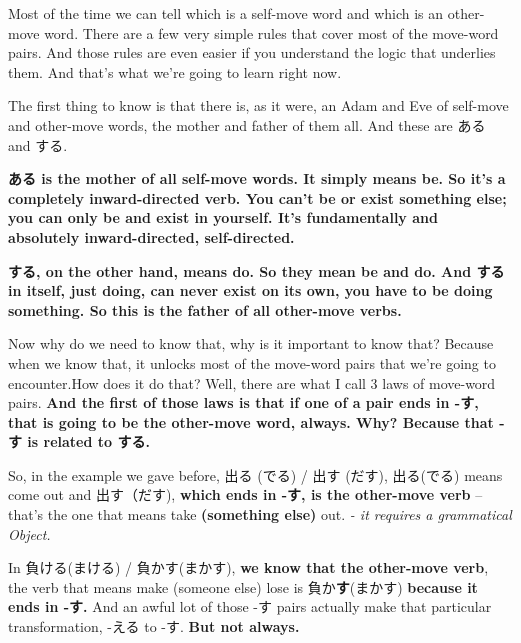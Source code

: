 Most of the time we can tell which is a self-move word and which is an other-move word. There are a few very simple rules that cover most of the move-word pairs. And those rules are even easier if you understand the logic that underlies them. And that's what we're going to learn right now.

\startsectionlevel[title={ある ＆ する},reference={ある-する}]

The first thing to know is that there is, as it were, an Adam and Eve of self-move and other-move words, the mother and father of them all. And these are ある and する.

{}

{\bf ある is the mother of all self-move words. It simply means be. So it's a completely inward-directed verb. You can't be or exist something else; you can only be and exist in yourself. It's fundamentally and absolutely inward-directed, self-directed.}

\thinrule

{\bf する, on the other hand, means do. So they mean be and do. And する in itself, just doing, can never exist on its own, you have to be doing something. So this is the father of all other-move verbs.}

\stopsectionlevel

\startsectionlevel[title={する Family Rule},reference={する-family-rule}]

Now why do we need to know that, why is it important to know that? Because when we know that, it unlocks most of the move-word pairs that we're going to encounter.How does it do that? Well, there are what I call 3 laws of move-word pairs. {\bf And the first of those laws is that if one of a pair ends in -す, that is going to be the other-move word, always. Why? Because that -す is related to する.}

{}

So, in the example we gave before, 出る (でる) / 出す (だす), 出る(でる) means come out and 出す（だす), {\bf which ends in -す, is the other-move verb} -- that's the one that means take {\bf (something else)} out. {\em - it requires a grammatical Object.}

In 負ける(まける) / 負かす(まかす), {\bf we know that the other-move verb}, the verb that means make (someone else) lose is 負か{\bf す}(まかす) {\bf because it ends in -す.} And an awful lot of those -す pairs actually make that particular transformation, -える to -す. {\bf But not always.}

